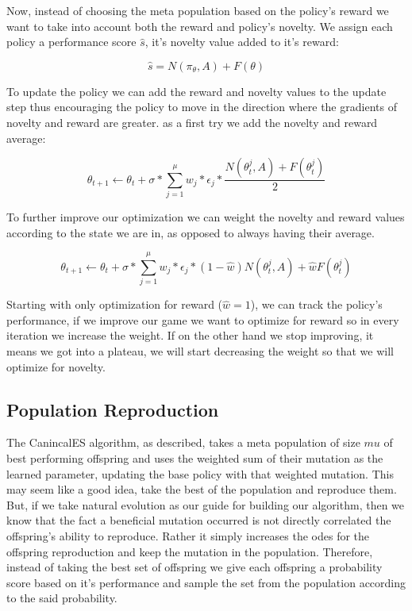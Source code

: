 \documentclass[11 pt, twocolumn]{article}
\begin{document}
Now, instead of choosing the meta population based on the policy's reward we want to take into account both the reward and policy's novelty. We assign each policy a performance score $\hat{s}$, it's novelty value added to it's reward:

\begin{equation*}
\hat{s}=N(\pi_\theta,A)+F(\theta)
\end{equation*}

To update the policy we can add the reward and novelty values to the update step thus encouraging the policy to move in the direction where the gradients of novelty and reward are greater. as a first try we add the novelty and reward average:

\begin{equation*}
\theta_{t+1}\gets\theta_t+\sigma*\sum_{j=1}^{\mu}w_j*\epsilon_j*\frac{N(\theta_t^j,A)+F(\theta_t^j)}{2}
\end{equation*}

To further improve our optimization we can weight the novelty and reward values according to the state we are in, as opposed to always having their average.

\begin{equation*}
\theta_{t+1}\gets\theta_t+\sigma*\sum_{j=1}^{\mu}w_j*\epsilon_j*(1-\hat{w})N(\theta_t^j,A)+\hat{w}F(\theta_t^j)
\end{equation*}

Starting with only optimization for reward ($\hat{w}=1$), we can track the policy's performance, if we improve our game we want to optimize for reward so in every iteration we increase the weight. If on the other hand we stop improving, it means we got into a plateau, we will start decreasing the weight so that we will optimize for novelty.

\subsection{Population Reproduction}
The CanincalES algorithm, as described, takes a meta population of size $mu$ of best performing offspring and uses the weighted sum of their mutation as the learned parameter, updating the base policy with that weighted mutation. This may seem like a good idea, take the best of the population and reproduce them. But, if we take natural evolution as our guide for building our algorithm, then we know that the fact a beneficial mutation occurred is not directly correlated the offspring's ability to reproduce. Rather it simply increases the odes for the offspring reproduction and keep the mutation in the population. Therefore, instead of taking the best set of offspring we give each offspring a probability score based on it's performance and sample the set from the population according to the said probability.
\end{document}
